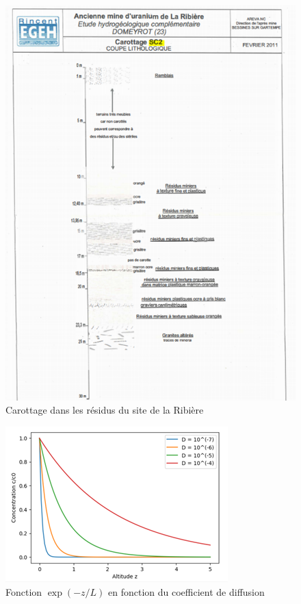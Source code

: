 \documentclass{article}
\begin{document}
\begin{figure}[H]
    \centering
    \includegraphics[width = 14.5cm]{III_C_1.png}
    \caption{Carottage dans les résidus du site de la Ribière}
    \label{fig:carottage_residus}
\end{figure}

\begin{figure}[H]
    \centering
    \includegraphics[height = 0.4 \textheight]{III_C_8.png}
    \caption{Fonction $\exp(-z/L)$ en fonction du coefficient de diffusion}
    \label{fig:sens_diffusion}
\end{figure}
\end{document}
